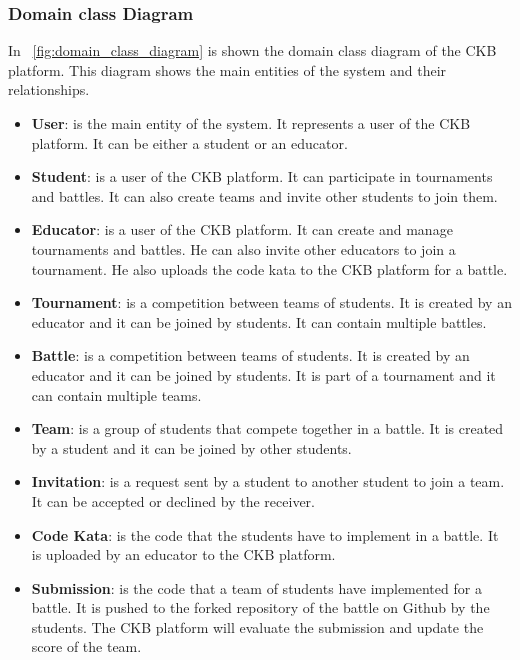 \subsubsection{Domain class Diagram}
In \figurename~\ref{fig:domain_class_diagram} is shown the domain class diagram of the CKB platform. This diagram shows the main entities of the system and their relationships.
\begin{itemize}
    \item \textbf{User}: is the main entity of the system. It represents a user of the CKB platform. It can be either a student or an educator.
    \item \textbf{Student}: is a user of the CKB platform. It can participate in tournaments and battles. It can also create teams and invite other students to join them.
    \item \textbf{Educator}: is a user of the CKB platform. It can create and manage tournaments and battles. He can also invite other educators to join a tournament. He also uploads the code kata to the CKB platform for a battle.
    \item \textbf{Tournament}: is a competition between teams of students. It is created by an educator and it can be joined by students. It can contain multiple battles.
    \item \textbf{Battle}: is a competition between teams of students. It is created by an educator and it can be joined by students. It is part of a tournament and it can contain multiple teams.
    \item \textbf{Team}: is a group of students that compete together in a battle. It is created by a student and it can be joined by other students.
    \item \textbf{Invitation}: is a request sent by a student to another student to join a team. It can be accepted or declined by the receiver.
    \item \textbf{Code Kata}: is the code that the students have to implement in a battle. It is uploaded by an educator to the CKB platform.
    \item \textbf{Submission}: is the code that a team of students have implemented for a battle. It is pushed to the forked repository of the battle on Github by the students. The CKB platform will evaluate the submission and update the score of the team.
    
\end{itemize}

